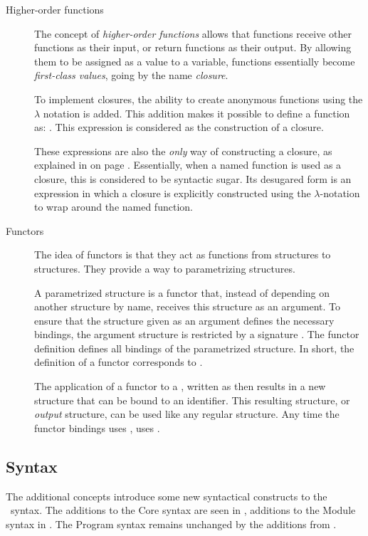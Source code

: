 \begin{description}
\item[Higher-order functions]
The concept of \emph{higher-order functions} allows that functions receive other functions as their input, or return functions as their output.
By allowing them to be assigned as a value to a variable, functions essentially become \emph{first-class values}, going by the name \emph{closure}.

To implement closures, the ability to create anonymous functions using the $\lambda$ notation is added.
This addition makes it possible to define a function as: .
This expression is considered as the construction of a closure.

These expressions are also the \emph{only} way of constructing a closure, as explained in  on page \pageref{sec:OnlyLambdaClosures}. 
Essentially, when a named function is used as a closure, this is considered to be syntactic sugar.
Its desugared form is an expression in which a closure is explicitly constructed using the $\lambda$-notation to wrap around the named function.

\item[Functors]
The idea of functors is that they act as functions from structures to structures.
They provide a way to parametrizing structures.

A parametrized structure is a functor  that, instead of depending on another structure  by name, receives this structure as an argument.
To ensure that the structure given as an argument defines the necessary bindings, the argument structure is restricted by a signature .
The functor definition defines all bindings of the parametrized structure.
In short, the definition of a functor corresponds to .

The application of a functor  to a , written as  then results in a new structure  that can be bound to an identifier.
This resulting structure, or \emph{output} structure, can be used like any regular structure. Any time the functor bindings uses ,  uses .

\end{description}

\subsection{Syntax}
The additional concepts introduce some new syntactical constructs to the \MiniML\ syntax.
The additions to the Core syntax are seen in , additions to the Module syntax in .
The Program syntax remains unchanged by the additions from .

